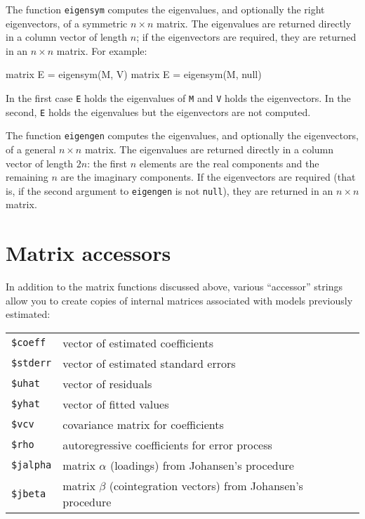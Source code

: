 The function \texttt{eigensym} computes the eigenvalues, and
optionally the right eigenvectors, of a symmetric $n \times n$ matrix.
The eigenvalues are returned directly in a column vector of length
$n$; if the eigenvectors are required, they are returned in an $n
\times n$ matrix.  For example:
%
\begin{code}
matrix E = eigensym(M, V)
matrix E = eigensym(M, null)
\end{code}
%
In the first case \texttt{E} holds the eigenvalues of \texttt{M} and
\texttt{V} holds the eigenvectors.  In the second, \texttt{E} holds
the eigenvalues but the eigenvectors are not computed.

The function \texttt{eigengen} computes the eigenvalues, and
optionally the eigenvectors, of a general $n \times n$ matrix.  The
eigenvalues are returned directly in a column vector of length $2n$:
the first $n$ elements are the real components and the remaining $n$
are the imaginary components.  If the eigenvectors are required (that
is, if the second argument to \texttt{eigengen} is not \texttt{null}),
they are returned in an $n \times n$ matrix.

\section{Matrix accessors}
\label{matrix-accessors}

In addition to the matrix functions discussed above,
various ``accessor'' strings allow you to create copies of internal
matrices associated with models previously estimated:

\begin{center}
\begin{tabular}{ll}
\texttt{\$coeff} & vector of estimated coefficients \\
\texttt{\$stderr} & vector of estimated standard errors \\
\texttt{\$uhat} & vector of residuals \\
\texttt{\$yhat} & vector of fitted values \\
\texttt{\$vcv} & covariance matrix for coefficients \\
\texttt{\$rho} & autoregressive coefficients for error process \\
\texttt{\$jalpha} & matrix $\alpha$ (loadings) from Johansen's procedure \\
\texttt{\$jbeta} & matrix $\beta$ (cointegration vectors) from Johansen's procedure
\end{tabular}
\end{center}

